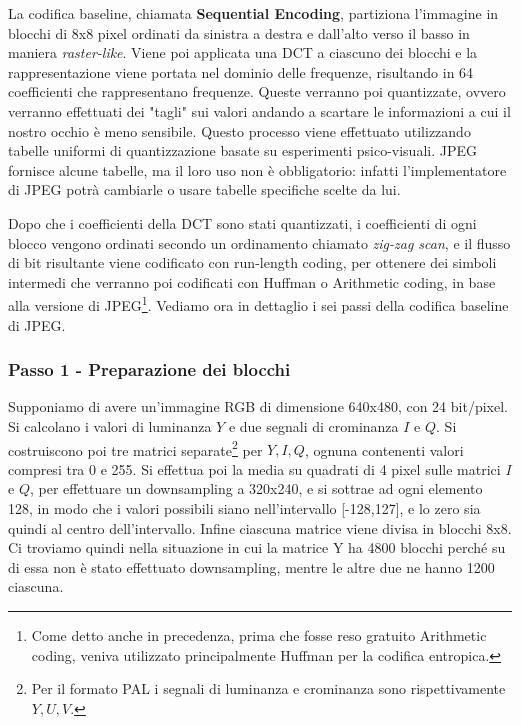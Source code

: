 \begin{figure}[htbp!]
  \centering
  
\end{figure}
\FloatBarrier

La codifica baseline, chiamata \textbf{Sequential Encoding}, partiziona l'immagine in blocchi di 8x8 pixel ordinati da sinistra a destra e dall'alto verso il basso in maniera \textit{raster-like}. Viene poi applicata una DCT a ciascuno dei blocchi e la rappresentazione viene portata nel dominio delle frequenze, risultando in 64 coefficienti che rappresentano frequenze. Queste verranno poi quantizzate, ovvero verranno effettuati dei "tagli" sui valori andando a scartare le informazioni a cui il nostro occhio è meno sensibile. Questo processo viene effettuato utilizzando tabelle uniformi di quantizzazione basate su esperimenti psico-visuali. JPEG fornisce alcune tabelle, ma il loro uso non è obbligatorio: infatti l'implementatore di JPEG potrà cambiarle o usare tabelle specifiche scelte da lui. 

Dopo che i coefficienti della DCT sono stati quantizzati, i coefficienti di ogni blocco vengono ordinati secondo un ordinamento chiamato \textit{zig-zag scan}, e il flusso di bit risultante viene codificato con run-length coding, per ottenere dei simboli intermedi che verranno poi codificati con Huffman o Arithmetic coding, in base alla versione di JPEG\footnote{Come detto anche in precedenza, prima che fosse reso gratuito Arithmetic coding, veniva utilizzato principalmente Huffman per la codifica entropica.}. Vediamo ora in dettaglio i sei passi della codifica baseline di JPEG.

\subsubsection{Passo 1 - Preparazione dei blocchi}
Supponiamo di avere un'immagine RGB di dimensione 640x480, con 24 bit/pixel. Si calcolano i valori di luminanza \(Y\) e due segnali di crominanza \(I\) e \(Q\). Si costruiscono poi tre matrici separate\footnote{Per il formato PAL i segnali di luminanza e crominanza sono rispettivamente \(Y, U, V\).} per \(Y, I, Q\), ognuna contenenti valori compresi tra 0 e 255. Si effettua poi la media su quadrati di 4 pixel sulle matrici \(I\) e \(Q\), per effettuare un downsampling a 320x240, e si sottrae ad ogni elemento 128, in modo che i valori possibili siano nell'intervallo [-128,127], e lo zero sia quindi al centro dell'intervallo. Infine ciascuna matrice viene divisa in blocchi 8x8. Ci troviamo quindi nella situazione in cui la matrice Y ha 4800 blocchi perché su di essa non è stato effettuato downsampling, mentre le altre due ne hanno 1200 ciascuna.

